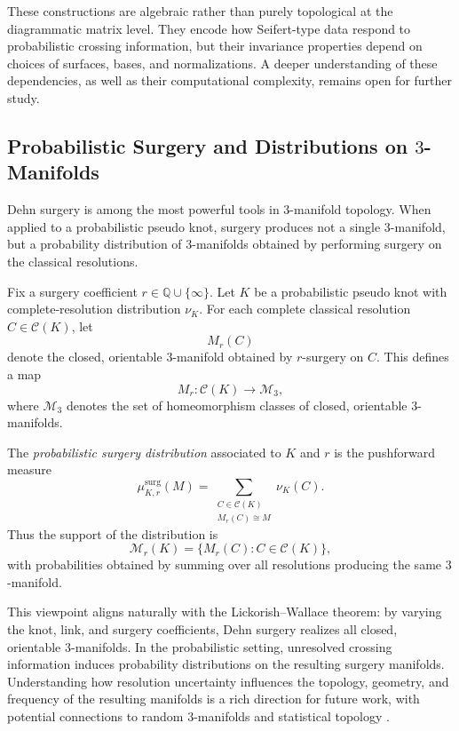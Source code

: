 \documentclass[a4paper, reqno, 12pt]{amsart}
\theoremstyle{plain}
\theoremstyle{definition}
\begin{document}
These constructions are algebraic rather than purely topological at the diagrammatic matrix level. They encode how Seifert-type data respond to probabilistic crossing information, but their invariance properties depend on choices of surfaces, bases, and normalizations. A deeper understanding of these dependencies, as well as their computational complexity, remains open for further study.





\subsection{Probabilistic Surgery and Distributions on \(3\)-Manifolds}

Dehn surgery is among the most powerful tools in \(3\)-manifold topology. When applied to a probabilistic pseudo knot, surgery produces not a single \(3\)-manifold, but a probability distribution of \(3\)-manifolds obtained by performing surgery on the classical resolutions.

Fix a surgery coefficient \(r\in\mathbb Q\cup\{\infty\}\). Let \(K\) be a probabilistic pseudo knot with complete-resolution distribution \(\nu_K\). For each complete classical resolution \(C\in\mathcal C(K)\), let
\[
M_r(C)
\]
denote the closed, orientable \(3\)-manifold obtained by \(r\)-surgery on \(C\). This defines a map
\[
M_r:\mathcal C(K)\longrightarrow \mathcal M_3,
\]
where \(\mathcal M_3\) denotes the set of homeomorphism classes of closed, orientable \(3\)-manifolds.

The \emph{probabilistic surgery distribution} associated to \(K\) and \(r\) is the pushforward measure
\[
\mu_{K,r}^{\mathrm{surg}}(M)
=
\sum_{\substack{C\in\mathcal C(K)\\ M_r(C)\cong M}}
\nu_K(C).
\]
Thus the support of the distribution is
\[
\mathcal M_r(K)
=
\{M_r(C): C\in\mathcal C(K)\},
\]
with probabilities obtained by summing over all resolutions producing the same \(3\)-manifold.

This viewpoint aligns naturally with the Lickorish--Wallace theorem: by varying the knot, link, and surgery coefficients, Dehn surgery realizes all closed, orientable \(3\)-manifolds. In the probabilistic setting, unresolved crossing information induces probability distributions on the resulting surgery manifolds. Understanding how resolution uncertainty influences the topology, geometry, and frequency of the resulting manifolds is a rich direction for future work, with potential connections to random \(3\)-manifolds and statistical topology \cite{DunfieldThurston2006}.
\end{document}
